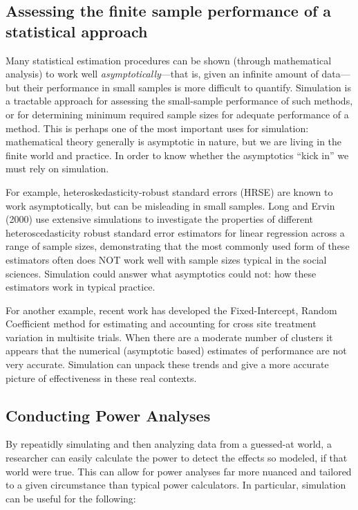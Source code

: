 \documentclass[
]{book}
\begin{document}
\hypertarget{assessing-the-finite-sample-performance-of-a-statistical-approach}{%
\subsection{Assessing the finite sample performance of a statistical approach}\label{assessing-the-finite-sample-performance-of-a-statistical-approach}}

Many statistical estimation procedures can be shown (through mathematical analysis) to work well \emph{asymptotically}---that is, given an infinite amount of data---but their performance in small samples is more difficult to quantify.
Simulation is a tractable approach for assessing the small-sample performance of such methods, or for determining minimum required sample sizes for adequate performance of a method.
This is perhaps one of the most important uses for simulation: mathematical theory generally is asymptotic in nature, but we are living in the finite world and practice.
In order to know whether the asymptotics ``kick in'' we must rely on simulation.

For example, heteroskedasticity-robust standard errors (HRSE) are known to work asymptotically, but can be misleading in small samples.
Long and Ervin (2000) use extensive simulations to investigate the properties of different heteroscedasticity robust standard error estimators for linear regression across a range of sample sizes, demonstrating that the most commonly used form of these estimators often does NOT work well with sample sizes typical in the social sciences.
Simulation could answer what asymptotics could not: how these estimators work in typical practice.

For another example, recent work has developed the Fixed-Intercept, Random Coefficient method for estimating and accounting for cross site treatment variation in multisite trials. When there are a moderate number of clusters it appears that the numerical (asymptotic based) estimates of performance are not very accurate. Simulation can unpack these trends and give a more accurate picture of effectiveness in these real contexts.

\hypertarget{conducting-power-analyses}{%
\subsection{Conducting Power Analyses}\label{conducting-power-analyses}}

By repeatidly simulating and then analyzing data from a guessed-at world, a researcher can easily calculate the power to detect the effects so modeled, if that world were true.
This can allow for power analyses far more nuanced and tailored to a given circumstance than typical power calculators. In particular, simulation can be useful for the following:
\end{document}
